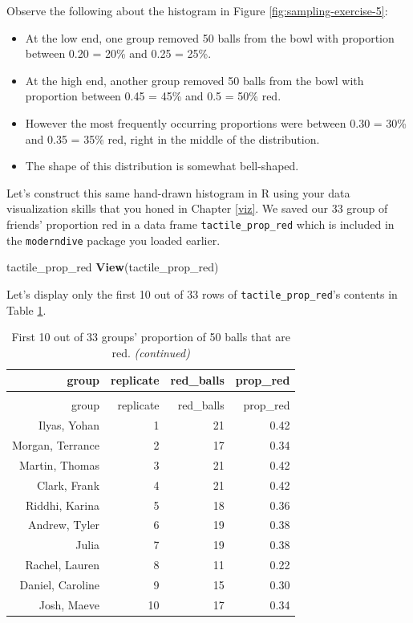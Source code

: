 \documentclass[12pt, krantz2,]{krantz}
\makeatletter
\newenvironment{Shaded}{\begin{snugshade}}{\end{snugshade}}
\newcommand{\KeywordTok}[1]{\textcolor[rgb]{0.27,0.27,0.27}{\textbf{#1}}}
\newcommand{\NormalTok}[1]{#1}
\providecommand{\tightlist}{%
  \setlength{\itemsep}{0pt}\setlength{\parskip}{0pt}}
\newenvironment{kframe}{%
\medskip{}
\setlength{\fboxsep}{.8em}
 \def\at@end@of@kframe{}%
 \ifinner\ifhmode%
  \def\at@end@of@kframe{\end{minipage}}%
  \begin{minipage}{\columnwidth}%
 \fi\fi%
 \def\FrameCommand##1{\hskip\@totalleftmargin \hskip-\fboxsep
 \colorbox{shadecolor}{##1}\hskip-\fboxsep
     \hskip-\linewidth \hskip-\@totalleftmargin \hskip\columnwidth}%
 \MakeFramed {\advance\hsize-\width
   \@totalleftmargin\z@ \linewidth\hsize
   \@setminipage}}%
 {\par\unskip\endMakeFramed%
 \at@end@of@kframe}
\renewenvironment{Shaded}{\begin{kframe}}{\end{kframe}}
\makeatother
\begin{document}
Observe the following about the histogram in Figure \ref{fig:sampling-exercise-5}:

\begin{itemize}
\tightlist
\item
  At the low end, one group removed 50 balls from the bowl with proportion between 0.20 = 20\% and 0.25 = 25\%.
\item
  At the high end, another group removed 50 balls from the bowl with proportion between 0.45 = 45\% and 0.5 = 50\% red.
\item
  However the most frequently occurring proportions were between 0.30 = 30\% and 0.35 = 35\% red, right in the middle of the distribution.
\item
  The shape of this distribution is somewhat bell-shaped.
\end{itemize}

Let's construct this same hand-drawn histogram in R using your data visualization skills that you honed in Chapter \ref{viz}. We saved our 33 group of friends' proportion red in a data frame \texttt{tactile\_prop\_red} which is included in the \texttt{moderndive} package you loaded earlier.

\begin{Shaded}
\begin{Highlighting}[]
\NormalTok{tactile_prop_red}
\KeywordTok{View}\NormalTok{(tactile_prop_red)}
\end{Highlighting}
\end{Shaded}

Let's display only the first 10 out of 33 rows of \texttt{tactile\_prop\_red}'s contents in Table \ref{tab:tactilered}.

\begingroup\fontsize{10}{12}\selectfont

\begin{longtable}{rrrr}
\caption{\label{tab:tactilered}\label{tab:tactilered}First 10 out of 33 groups' proportion of 50 balls that are red.}\\
\toprule
group & replicate & red\_balls & prop\_red\\
\midrule
\endfirsthead
\caption[]{\label{tab:tactilered}First 10 out of 33 groups' proportion of 50 balls that are red. \textit{(continued)}}\\
\toprule
group & replicate & red\_balls & prop\_red\\
\midrule
\endhead
\
\endfoot
\bottomrule
\endlastfoot
Ilyas, Yohan & 1 & 21 & 0.42\\
Morgan, Terrance & 2 & 17 & 0.34\\
Martin, Thomas & 3 & 21 & 0.42\\
Clark, Frank & 4 & 21 & 0.42\\
Riddhi, Karina & 5 & 18 & 0.36\\
\addlinespace
Andrew, Tyler & 6 & 19 & 0.38\\
Julia & 7 & 19 & 0.38\\
Rachel, Lauren & 8 & 11 & 0.22\\
Daniel, Caroline & 9 & 15 & 0.30\\
Josh, Maeve & 10 & 17 & 0.34\\*
\end{longtable}
\endgroup{}
\end{document}
